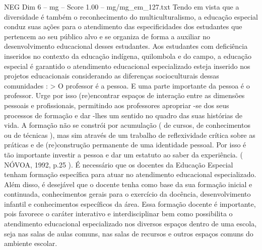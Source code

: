 \begin{textsample}{NEG Dim 6 – mg – Score 1.00 – mg/mg\_em\_127.txt}
Tendo em vista que a diversidade é também o reconhecimento do multiculturalismo, a educação especial conduz suas ações para o atendimento das especificidades dos estudantes que pertencem ao seu público alvo e se organiza de forma a auxiliar no desenvolvimento educacional desses estudantes.
Aos estudantes com deficiência inseridos no contexto da educação indígena, quilombola e do campo, a educação especial é garantido o atendimento educacional especializado esteja inserido nos projetos educacionais considerando as diferenças socioculturais dessas comunidades : > O professor é a pessoa.
E uma parte importante da pessoa é o professor.
Urge por isso (re)encontrar espaços de interação entre as dimensões pessoais e profissionais, permitindo aos professores apropriar -se dos seus processos de formação e dar -lhes um sentido no quadro das suas histórias de vida.
A formação não se constrói por acumulação ( de cursos, de conhecimentos ou de técnicas ), mas sim através de um trabalho de reflexividade crítica sobre as práticas e de (re)construção permanente de uma identidade pessoal.
Por isso é tão importante investir a pessoa e dar um estatuto ao saber da experiência. ( NÓVOA, 1992, p.25 ).
É necessário que os docentes da Educação Especial tenham formação específica para atuar no atendimento educacional especializado.
Além disso, é desejável que o docente tenha como base da sua formação inicial e continuada, conhecimentos gerais para o exercício da docência, desenvolvimento infantil e conhecimentos específicos da área.
Essa formação docente é importante, pois favorece o caráter interativo e interdisciplinar bem como possibilita o atendimento educacional especializado nos diversos espaços dentro de uma escola, seja nas salas de aulas comuns, nas salas de recursos e outros espaços comuns do ambiente escolar.

\end{textsample}
